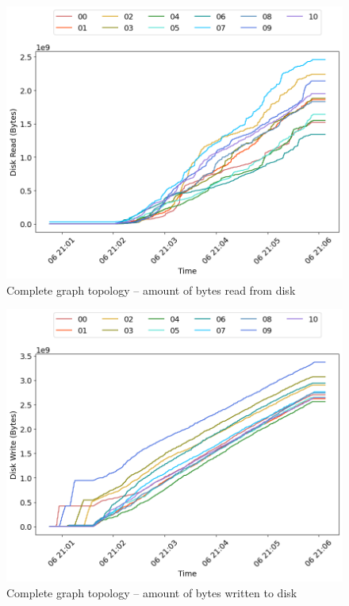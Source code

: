 \begin{minipage}{0.5\linewidth}
\begin{figure}[H]
\captionsetup{justification=centering,width=0.8\linewidth}
\includegraphics[width=\linewidth]{figures/graph-complete/blk_read.png}
\caption{Complete graph topology -- amount of bytes read from disk}
\label{fig:graph-complete-net_read}
\end{figure}
\end{minipage}
\begin{minipage}{0.5\linewidth}
\begin{figure}[H]
\captionsetup{justification=centering,width=0.8\linewidth}
\includegraphics[width=\linewidth]{figures/graph-complete/blk_write.png}
\caption{Complete graph topology -- amount of bytes written to disk}
\label{fig:graph-complete-net_write}
\end{figure}
\end{minipage}

